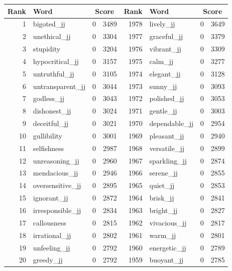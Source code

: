 \begin{table}[tbp]
    \begin{tabular}{| rlr@{.}l | rlr@{.}l |}
    \hline
    \textbf{Rank} & \textbf{Word} & \multicolumn{2}{c|}{\textbf{Score}} & \textbf{Rank} & \textbf{Word} & \multicolumn{2}{c|}{\textbf{Score}} \\
    \hline
    1 & bigoted\_jj & 0 & 3489    &    1978 & lively\_jj & 0 & 3649 \\
    2 & unethical\_jj & 0 & 3304    &    1977 & graceful\_jj & 0 & 3379 \\
    3 & stupidity & 0 & 3204    &    1976 & vibrant\_jj & 0 & 3309 \\
    4 & hypocritical\_jj & 0 & 3157    &    1975 & calm\_jj & 0 & 3277 \\
    5 & untruthful\_jj & 0 & 3105    &    1974 & elegant\_jj & 0 & 3128 \\
    6 & untransparent\_jj & 0 & 3044    &    1973 & sunny\_jj & 0 & 3093 \\
    7 & godless\_jj & 0 & 3043    &    1972 & polished\_jj & 0 & 3053 \\
    8 & dishonest\_jj & 0 & 3024    &    1971 & gentle\_jj & 0 & 3003 \\
    9 & deceitful\_jj & 0 & 3021    &    1970 & dependable\_jj & 0 & 2954 \\
    10 & gullibility & 0 & 3001    &    1969 & pleasant\_jj & 0 & 2940 \\
    11 & selfishness & 0 & 2987    &    1968 & versatile\_jj & 0 & 2899 \\
    12 & unreasoning\_jj & 0 & 2960    &    1967 & sparkling\_jj & 0 & 2874 \\
    13 & mendacious\_jj & 0 & 2946    &    1966 & serene\_jj & 0 & 2855 \\
    14 & oversensitive\_jj & 0 & 2895    &    1965 & quiet\_jj & 0 & 2853 \\
    15 & ignorant\_jj & 0 & 2872    &    1964 & brisk\_jj & 0 & 2841 \\
    16 & irresponsible\_jj & 0 & 2834    &    1963 & bright\_jj & 0 & 2827 \\
    17 & callousness & 0 & 2815    &    1962 & vivacious\_jj & 0 & 2817 \\
    18 & irrational\_jj & 0 & 2802    &    1961 & warm\_jj & 0 & 2801 \\
    19 & unfeeling\_jj & 0 & 2792    &    1960 & energetic\_jj & 0 & 2789 \\
    20 & greedy\_jj & 0 & 2792    &    1959 & buoyant\_jj & 0 & 2785 \\

\end{tabular}
\end{table}
